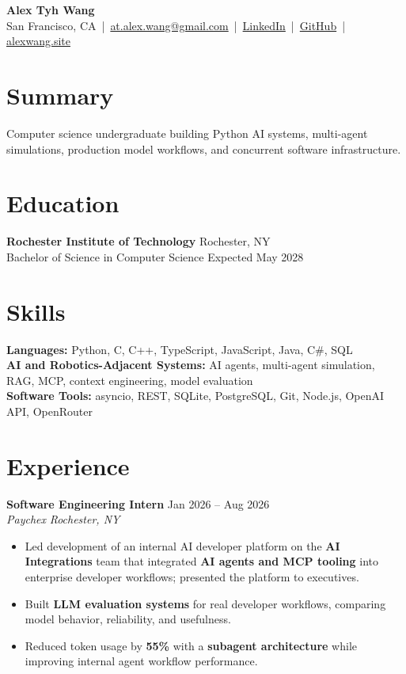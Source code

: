 \documentclass[10pt,letterpaper]{article}
\newif\ifresumeFirstRole
\newcommand{\resumeRole}[4]{%
  \ifresumeFirstRole
    \global\resumeFirstRolefalse
  \else
    \vspace{0pt plus 1fill}%
  \fi
  \textbf{#1} \hfill #2\\
  \textit{#3} \hfill \textit{#4}
}
\begin{document}
\begin{center}
{\Large \textbf{Alex Tyh Wang}}\\
San Francisco, CA \,|\, \href{mailto:at.alex.wang@gmail.com}{at.alex.wang@gmail.com} \,|\, \href{https://www.linkedin.com/in/alex-tyh-wang/}{LinkedIn} \,|\, \href{https://github.com/alextyhwang}{GitHub} \,|\, \href{https://alexwang.site}{alexwang.site}
\end{center}

\section*{Summary}
Computer science undergraduate building Python AI systems, multi-agent simulations, production model workflows, and concurrent software infrastructure.

\section*{Education}
\textbf{Rochester Institute of Technology} \hfill Rochester, NY\\
Bachelor of Science in Computer Science \hfill Expected May 2028

\section*{Skills}
\textbf{Languages:} Python, C, C++, TypeScript, JavaScript, Java, C\#, SQL\\
\textbf{AI and Robotics-Adjacent Systems:} AI agents, multi-agent simulation, RAG, MCP, context engineering, model evaluation\\
\textbf{Software Tools:} asyncio, REST, SQLite, PostgreSQL, Git, Node.js, OpenAI API, OpenRouter

\section*{Experience}
\resumeRole{Software Engineering Intern}{Jan 2026 -- Aug 2026}{Paychex}{Rochester, NY}
\begin{itemize}
  \item Led development of an internal AI developer platform on the \textbf{AI Integrations} team that integrated \textbf{AI agents and MCP tooling} into enterprise developer workflows; presented the platform to executives.
  \item Built \textbf{LLM evaluation systems} for real developer workflows, comparing model behavior, reliability, and usefulness.
  \item Reduced token usage by \textbf{55\%} with a \textbf{subagent architecture} while improving internal agent workflow performance.
\end{itemize}
\end{document}
